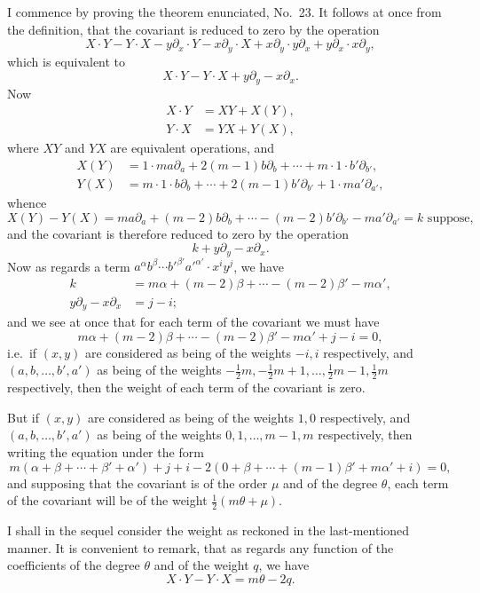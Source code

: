 \documentclass[11pt]{article}
\begin{document}
I commence by proving the theorem enunciated, No.~23. It follows at once from the definition, that the covariant is reduced to zero by the operation
\[
X\cdot Y - Y\cdot X - y\partial_x\cdot Y - x\partial_y\cdot X + x\partial_y\cdot y\partial_x + y\partial_x\cdot x\partial_y,
\]
which is equivalent to
\[
X\cdot Y - Y\cdot X + y\partial_y - x\partial_x.
\]
Now
\begin{align*}
X\cdot Y &= XY + X(Y), \\
Y\cdot X &= YX + Y(X),
\end{align*}
where $XY$ and $YX$ are equivalent operations, and
\begin{align*}
X(Y) &= 1\cdot m a\partial_a + 2(m - 1) b\partial_b + \cdots + m\cdot 1\cdot b'\partial_{b'}, \\
Y(X) &= m\cdot 1\cdot b\partial_b + \cdots + 2(m - 1) b'\partial_{b'} + 1\cdot m a'\partial_{a'},
\end{align*}
whence
\[
X(Y) - Y(X) = m a\partial_a + (m - 2)b\partial_b + \cdots - (m - 2)b'\partial_{b'} - m a'\partial_{a'} = k\text{ suppose,}
\]
and the covariant is therefore reduced to zero by the operation
\[
k + y\partial_y - x\partial_x.
\]
Now as regards a term $a^\alpha b^\beta \cdots b'^{\beta'} a'^{\alpha'}\cdot x^i y^j$, we have
\begin{align*}
k &= m\alpha + (m - 2)\beta + \cdots - (m - 2)\beta' - m\alpha', \\
y\partial_y - x\partial_x &= j - i;
\end{align*}
and we see at once that for each term of the covariant we must have
\[
m\alpha + (m - 2)\beta + \cdots - (m - 2)\beta' - m\alpha' + j - i = 0,
\]
i.e.\ if $(x, y)$ are considered as being of the weights $-i, i$ respectively, and $(a, b, \ldots, b', a')$ as being of the weights $-\tfrac{1}{2}m, -\tfrac{1}{2}m + 1, \ldots, \tfrac{1}{2}m - 1, \tfrac{1}{2}m$ respectively, then the weight of each term of the covariant is zero.

But if $(x, y)$ are considered as being of the weights $1, 0$ respectively, and $(a, b, \ldots, b', a')$ as being of the weights $0, 1, \ldots, m-1, m$ respectively, then writing the equation under the form
\[
m(\alpha + \beta + \cdots + \beta' + \alpha') + j + i - 2(0 + \beta + \cdots + (m-1)\beta' + m\alpha' + i) = 0,
\]
and supposing that the covariant is of the order $\mu$ and of the degree $\theta$, each term of the covariant will be of the weight $\tfrac{1}{2}(m\theta + \mu)$.

I shall in the sequel consider the weight as reckoned in the last-mentioned manner. It is convenient to remark, that as regards any function of the coefficients of the degree $\theta$ and of the weight $q$, we have
\[
X\cdot Y - Y\cdot X = m\theta - 2q.
\]
\end{document}
